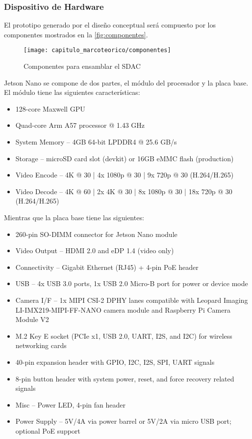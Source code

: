 \subsubsection{Dispositivo de Hardware}

El prototipo generado por el diseño conceptual será compuesto por los
componentes mostrados en la \autoref{fig:componentes}.

\begin{figure}[H]
    \centering
    \texttt{[image: capitulo\_marcoteorico/componentes]}
    \caption{Componentes para ensamblar el SDAC}\label{fig:componentes}
\end{figure}

Jetson Nano se compone de dos partes, el módulo del procesador y la placa base.
El módulo tiene las siguientes características:

\begin{itemize}
    \item 128-core Maxwell GPU
    \item Quad-core Arm A57 processor @ 1.43 GHz
    \item System Memory  – 4GB 64-bit LPDDR4 @ 25.6 GB/s
    \item Storage  – microSD card slot (devkit) or 16GB eMMC flash (production)
    \item Video Encode – 4K @ 30 | 4x 1080p @ 30 | 9x 720p @ 30 (H.264/H.265)
    \item Video Decode – 4K @ 60 | 2x 4K @ 30 | 8x 1080p @ 30 | 18x 720p @ 30
    (H.264/H.265)
\end{itemize}

Mientras que la placa base tiene las siguientes:

\begin{itemize}
    \item 260-pin SO-DIMM connector for Jetson Nano module
    \item Video Output – HDMI 2.0 and eDP 1.4 (video only)
    \item Connectivity – Gigabit Ethernet (RJ45) + 4-pin PoE header
    \item USB – 4x USB 3.0 ports, 1x USB 2.0 Micro-B port for power or device
    mode
    \item Camera I/F – 1x MIPI CSI-2 DPHY lanes compatible with Leopard Imaging
    LI-IMX219-MIPI-FF-NANO camera module and Raspberry Pi Camera Module V2
    \item M.2 Key E socket (PCIe x1, USB 2.0, UART, I2S, and I2C) for wireless
    networking cards
    \item 40-pin expansion header with GPIO, I2C, I2S, SPI, UART signals
    \item 8-pin button header with system power, reset, and force recovery
    related signals
    \item Misc – Power LED, 4-pin fan header
    \item Power Supply – 5V/4A via power barrel or 5V/2A via micro USB port;
    optional PoE support
\end{itemize}

